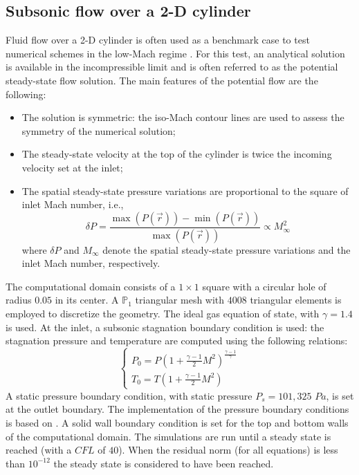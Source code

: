 \documentclass[review,10pt]{elsarticle}
\begin{document}
\subsection{Subsonic flow over a 2-D cylinder} \label{sec:cylinder}

Fluid flow over a 2-D cylinder is often used as a benchmark case to test numerical schemes in the 
low-Mach regime \cite{LowMach1, LowMach2, LowMach3}. For this test, an analytical solution is available 
in the incompressible limit and is often referred to as the potential steady-state flow solution. 
The main features of the potential flow are the following:
%
\begin{itemize}
\item The solution is symmetric: the iso-Mach contour lines are used to assess the symmetry of the numerical solution;
\item The steady-state velocity at the top of the cylinder is twice the incoming velocity set at the inlet;
\item The spatial steady-state pressure variations are proportional to the square of inlet Mach number, i.e., 
\begin{equation}
\delta P = \frac{\max(P(\vec{r})) - \min(P(\vec{r}))}{\max(P(\vec{r}))}  \propto M_\infty^2
\end{equation}
where $\delta P$ and $M_\infty$ denote the spatial steady-state pressure variations and the inlet Mach number, respectively.
\end{itemize}
%
The computational domain consists of a $1\times 1$ square with a circular hole of radius $0.05$ in its center. 
A $\mathbb{P}_1$ triangular mesh with $4008$ triangular elements is employed to discretize the geometry. 
The ideal gas equation of state, with $\gamma=1.4$ is used. At the inlet, a subsonic stagnation boundary 
condition is used: the stagnation pressure and temperature are computed using the following relations:
%
\begin{equation}
\label{eq:stagnation_relations}
\left\{
\begin{array}{l}
P_0 = P\left( 1 + \frac{\gamma-1}{2} M^2 \right)^{\frac{\gamma-1}{\gamma}} \\
T_0 = T\left( 1 + \frac{\gamma-1}{2} M^2 \right)
\end{array}
\right.
\end{equation}
%
A static pressure boundary condition, with static pressure $P_s = 101,325$ $Pa$, is set at the outlet boundary. 
The implementation of the pressure boundary conditions is based on \cite{SEM}. A solid wall boundary condition 
is set for the top and bottom walls of the computational domain. The simulations are run until a steady state 
is reached (with a $CFL$ of $40$). When the residual norm (for all equations) is less than $10^{-12}$ the 
steady state is considered to have been reached.
\end{document}
